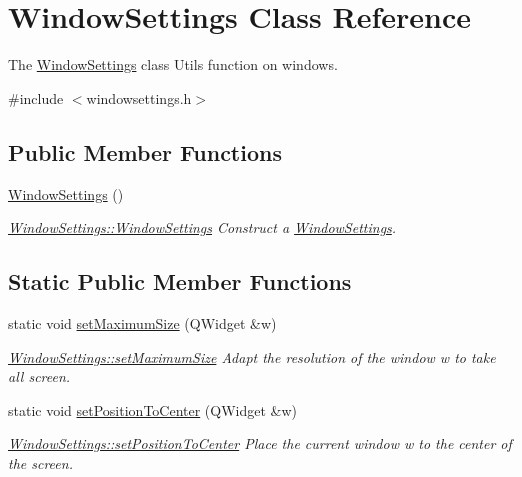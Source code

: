 \hypertarget{classWindowSettings}{\section{Window\-Settings Class Reference}
\label{classWindowSettings}
}


The \hyperlink{classWindowSettings}{Window\-Settings} class Utils function on windows.  




{\ttfamily \#include $<$windowsettings.\-h$>$}

\subsection*{Public Member Functions}
\begin{DoxyCompactItemize}
\item 
\hypertarget{classWindowSettings_a0e207ef630ccd1400f7066920b156fdf}{\hyperlink{classWindowSettings_a0e207ef630ccd1400f7066920b156fdf}{Window\-Settings} ()}\label{classWindowSettings_a0e207ef630ccd1400f7066920b156fdf}

\begin{DoxyCompactList}\small\item\em \hyperlink{classWindowSettings_a0e207ef630ccd1400f7066920b156fdf}{Window\-Settings\-::\-Window\-Settings} Construct a \hyperlink{classWindowSettings}{Window\-Settings}. \end{DoxyCompactList}\end{DoxyCompactItemize}
\subsection*{Static Public Member Functions}
\begin{DoxyCompactItemize}
\item 
static void \hyperlink{classWindowSettings_a4985100cde7abffff80d6675be2a6fd7}{set\-Maximum\-Size} (Q\-Widget \&w)
\begin{DoxyCompactList}\small\item\em \hyperlink{classWindowSettings_a4985100cde7abffff80d6675be2a6fd7}{Window\-Settings\-::set\-Maximum\-Size} Adapt the resolution of the window {\itshape w} to take all screen. \end{DoxyCompactList}\item 
static void \hyperlink{classWindowSettings_a30daec5f15eb722511dfb28333fdcef1}{set\-Position\-To\-Center} (Q\-Widget \&w)
\begin{DoxyCompactList}\small\item\em \hyperlink{classWindowSettings_a30daec5f15eb722511dfb28333fdcef1}{Window\-Settings\-::set\-Position\-To\-Center} Place the current window {\itshape w} to the center of the screen. \end{DoxyCompactList}\end{DoxyCompactItemize}


